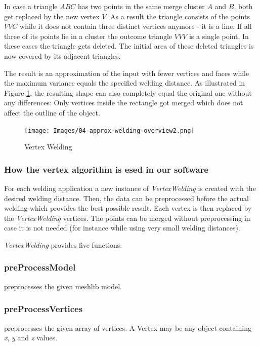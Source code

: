 \documentclass[../ClassicThesis.tex]{subfiles}
\begin{document}
In case a triangle $ABC$ has two points in the same merge cluster $A$ and $B$, both get replaced by the new vertex $V$. As a result the triangle consists of the points $VVC$ while it does not contain three distinct vertices anymore - it is a line. If all three of its points lie in a cluster the outcome triangle $VVV$ is a single point. In these cases the triangle gets deleted. The initial area of these deleted triangles is now covered by its adjacent triangles.

The result is an approximation of the input with fewer vertices and faces while the maximum variance equals the specified welding distance. As illustrated in Figure \ref{fig:vertex_welding}, the resulting shape can also completely equal the original one without any differences: Only vertices inside the rectangle got merged which does not affect the outline of the object.



\begin{figure}
\texttt{[image: Images/04-approx-welding-overview2.png]}
\caption{Vertex Welding}
\label{fig:vertex_welding}
\end{figure}

\subsubsection{How the vertex algorithm is esed in our software}

For each welding application a new instance of \emph{VertexWelding} is created with the desired welding distance. Then, the data can be preprocessed before the actual welding which provides the best possible result. Each vertex is then replaced by the \emph{VertexWelding} vertices. The points can be merged without preprocessing in case it is not needed (for instance while using very small welding distances).

\emph{VertexWelding} provides five functions:

\subsubsection*{preProcessModel}

preprocesses the given meshlib model.

\subsubsection*{preProcessVertices}

preprocesses the given array of vertices. A Vertex may be any object containing \emph{x}, \emph{y} and \emph{z} values.
\end{document}
